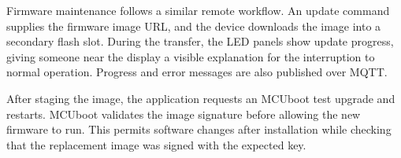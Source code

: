 Firmware maintenance follows a similar remote workflow. An update command supplies the firmware image URL, and the device downloads the image into a secondary flash slot. During the transfer, the LED panels show update progress, giving someone near the display a visible explanation for the interruption to normal operation. Progress and error messages are also published over MQTT.

After staging the image, the application requests an MCUboot test upgrade and restarts. MCUboot validates the image signature before allowing the new firmware to run. This permits software changes after installation while checking that the replacement image was signed with the expected key.